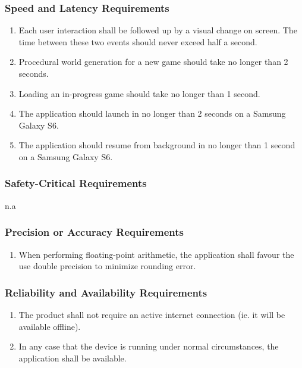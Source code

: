 \documentclass[]{article}
\begin{document}
\subsubsection{Speed and Latency Requirements}
\label{ssub:speed_and_latency_requirements}
\begin{enumerate}[{PR}1. ]
	\item Each user interaction shall be followed up by a visual change on screen. The time between these two events should never exceed half a second.
	\item Procedural world generation for a new game should take no longer than 2 seconds.
	\item Loading an in-progress game should take no longer than 1 second.
	\item The application should launch in no longer than 2 seconds on a Samsung Galaxy S6.
	\item The application should resume from background in no longer than 1 second on a Samsung Galaxy S6.
	\holdEnum
\end{enumerate}

\subsubsection{Safety-Critical Requirements}
\label{ssub:safety_critical_requirements}
n.a

\subsubsection{Precision or Accuracy Requirements}
\label{ssub:precision_or_accuracy_requirements}
\begin{enumerate}[{PR}1. ]
	\resumeEnum
	\item When performing floating-point arithmetic, the application shall favour the use double precision to minimize rounding error.
	\holdEnum
\end{enumerate}

\subsubsection{Reliability and Availability Requirements}
\label{ssub:reliability_and_availability_requirements}
\begin{enumerate}[{PR}1. ]
	\resumeEnum
	\item The product shall not require an active internet connection (ie. it will be available offline).
	\item In any case that the device is running under normal circumstances, the application shall be available.
	\holdEnum
\end{enumerate}
\end{document}
